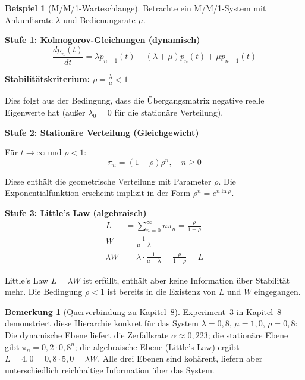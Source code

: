 ﻿\documentclass[a4paper,12pt]{report}
\theoremstyle{definition}
\newtheorem{bemerkung}{Bemerkung}[section]
\newtheorem{beispiel}{Beispiel}[section]
\begin{document}
\begin{beispiel}[M/M/1-Warteschlange]
	Betrachte ein M/M/1-System mit Ankunftsrate $\lambda$ und Bedienungsrate $\mu$.
	
	\textbf{Stufe 1: Kolmogorov-Gleichungen (dynamisch)}
	\begin{equation}
		\frac{dp_n(t)}{dt} = \lambda p_{n-1}(t) - (\lambda + \mu) p_n(t) + \mu p_{n+1}(t)
	\end{equation}
	
	\textbf{Stabilitätskriterium:} $\rho = \frac{\lambda}{\mu} < 1$
	
	Dies folgt aus der Bedingung, dass die Übergangsmatrix negative reelle Eigenwerte hat (außer $\lambda_0 = 0$ für die stationäre Verteilung).
	
	\textbf{Stufe 2: Stationäre Verteilung (Gleichgewicht)}
	
	Für $t \to \infty$ und $\rho < 1$:
	\begin{equation}
		\pi_n = (1-\rho) \rho^n, \quad n \geq 0
	\end{equation}
	
	Diese enthält die geometrische Verteilung mit Parameter $\rho$. Die Exponentialfunktion erscheint implizit in der Form $\rho^n = e^{n \ln \rho}$.
	
	\textbf{Stufe 3: Little's Law (algebraisch)}
	\begin{align}
		L &= \sum_{n=0}^{\infty} n \pi_n = \frac{\rho}{1-\rho} \\
		W &= \frac{1}{\mu - \lambda} \\
		\lambda W &= \lambda \cdot \frac{1}{\mu - \lambda} = \frac{\rho}{1-\rho} = L
	\end{align}
	
	Little's Law $L = \lambda W$ ist erfüllt, enthält aber keine Information
	über Stabilität mehr.  Die Bedingung $\rho < 1$ ist bereits in die Existenz
	von $L$ und $W$ eingegangen.
	
	\begin{bemerkung}[Querverbindung zu Kapitel~8]
		Experiment~3 in Kapitel~8 demonstriert diese Hierarchie konkret für das
		System $\lambda = 0{,}8$, $\mu = 1{,}0$, $\rho = 0{,}8$: Die
		dynamische Ebene liefert die Zerfallsrate $\alpha \approx 0{,}223$;
		die stationäre Ebene gibt $\pi_n = 0{,}2 \cdot 0{,}8^n$; die
		algebraische Ebene (Little's Law) ergibt $L = 4{,}0 = 0{,}8 \cdot 5{,}0 = \lambda W$.
		Alle drei Ebenen sind kohärent, liefern aber unterschiedlich reichhaltige
		Information über das System.
	\end{bemerkung}
\end{beispiel}
\end{document}
